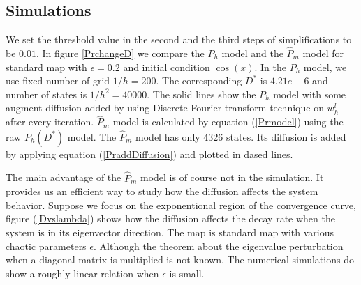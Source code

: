 \subsection{Simulations}
We set the threshold value in the second and the third steps of simplifications
 to be $0.01$. In figure \ref{PrchangeD} we compare the $P_h$ model and the $\hat{P}_m$ model for
standard map with $\epsilon=0.2$ and initial condition $\cos(x)$. In the $P_h$ model, we use fixed number of grid $1/h = 200$.
The corresponding $D^*$ is $4.21e-6$ and number of states is $1/h^2 = 40000$. The solid lines show the $P_h$ model with some augment diffusion added by using
Discrete Fourier transform technique on $w_h^l$ after every iteration. $\hat{P}_m$ model is calculated by
equation (\ref{Prmodel}) using the raw $P_h(D^*)$ model. The $\hat{P}_m$ model has only $4326$ states. Its diffusion is added by applying equation (\ref{PraddDiffusion}) and plotted in dased lines.

The main advantage of the $\hat{P}_m$ model is of course not in the simulation. It provides us an efficient way to study how the diffusion affects the system behavior. Suppose we focus on the exponentional region of the convergence curve, figure (\ref{Dvslambda}) shows how the diffusion affects the decay rate when the system is in its eigenvector direction. The map is standard map with various chaotic parameters $\epsilon$. Although the theorem about the eigenvalue perturbation when a diagonal matrix is multiplied is not known. The numerical simulations do show a roughly linear relation when $\epsilon$ is small.




